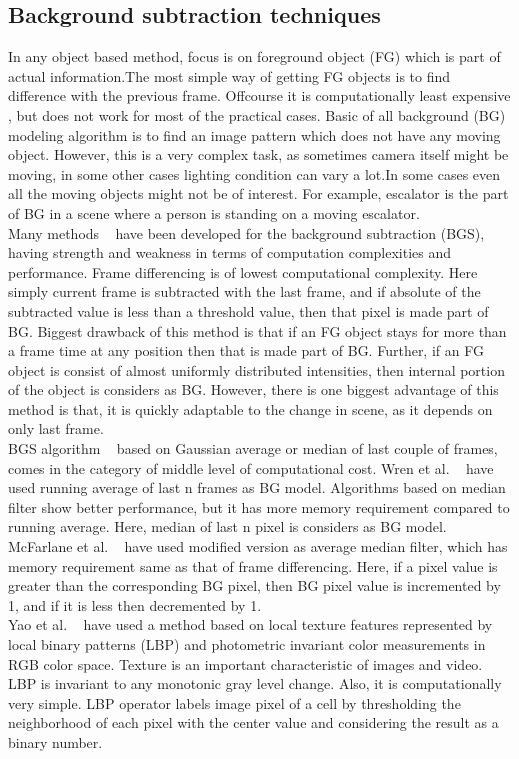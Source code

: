 \subsection{Background subtraction techniques}
In any object based method, focus is on foreground object (FG) which is part
of actual information.The most simple way of getting FG objects is to
find difference with the previous frame. Offcourse it is computationally
least expensive , but does not work for most of the practical
cases. Basic of all background (BG) modeling algorithm is to find an
image pattern which does not have any moving object. However, this is a
very complex task, as sometimes camera itself might be moving, in some
other cases lighting condition can vary a lot.In some cases even all the
moving objects might not be of interest. For example, escalator is the
part of BG in a scene where a person is standing on a moving
escalator.\\
Many methods ~\cite{9, 10, 11, 12, 13, 14} have been developed for the background
subtraction (BGS), having strength and weakness in terms of computation
complexities and performance. Frame differencing is of lowest
computational complexity. Here simply current frame is subtracted with
the last frame, and if absolute of the subtracted value is less than a
threshold value, then that pixel is made part of BG. Biggest drawback of
this method is that if an FG object stays for more than a frame time at
any position then that is made part of BG. Further, if an FG object is
consist of almost uniformly distributed intensities, then internal
portion of the object is considers as BG. However, there is one biggest
advantage of this method is that, it is quickly adaptable to the change
in scene, as it depends on only last frame.\\
BGS algorithm ~\cite{10, 12, 13, 14} based on Gaussian average or median of
last couple of frames, comes in the category of middle level of
computational cost. Wren et al. ~\cite{12} have used running average of
last n frames as BG model. Algorithms based on median filter show better
performance, but it has more memory requirement compared to running
average. Here, median of last n pixel is considers as BG model.
McFarlane et al. ~\cite{14} have used modified version as average median
filter, which has memory requirement same as that of frame differencing.
Here, if a pixel value is greater than the corresponding BG pixel, then
BG pixel value is incremented by 1, and if it is less then decremented
by 1.\\
Yao et al. ~\cite{11} have used a method based on local texture features
represented by local binary patterns (LBP) and photometric invariant
color measurements in RGB color space. Texture is an important
characteristic of images and video. LBP is invariant to any monotonic
gray level change. Also, it is computationally very simple. LBP operator
labels image pixel of a cell by thresholding the neighborhood of each pixel
with the center value and considering the result as a binary number.

